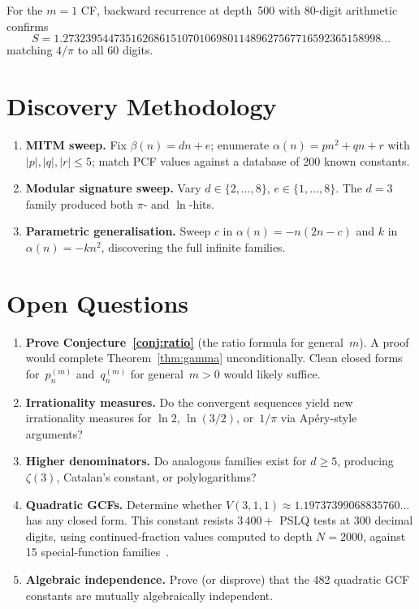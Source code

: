 \documentclass[11pt,a4paper]{article}
\theoremstyle{plain}
\theoremstyle{definition}
\theoremstyle{remark}
\begin{document}
For the $m = 1$ CF, backward recurrence at depth~500 with
80-digit arithmetic confirms
\[
  S = 1.27323954473516268615107010698011489627567716592365158998\ldots
\]
matching $4/\pi$ to all 60 digits.

\section{Discovery Methodology}\label{sec:method}

\begin{enumerate}
\item \textbf{MITM sweep.}
  Fix $\beta(n) = dn{+}e$; enumerate
  $\alpha(n) = pn^2{+}qn{+}r$ with $|p|,|q|,|r| \le 5$;
  match PCF values against a database of 200 known constants.
\item \textbf{Modular signature sweep.}
  Vary $d \in \{2,\ldots,8\}$, $e \in \{1,\ldots,8\}$.
  The $d{=}3$ family produced both $\pi$- and $\ln$-hits.
\item \textbf{Parametric generalisation.}
  Sweep $c$ in $\alpha(n) = -n(2n{-}c)$ and $k$ in
  $\alpha(n) = -kn^2$, discovering the full infinite families.
\end{enumerate}

\section{Open Questions}\label{sec:open}

\begin{enumerate}
\item \textbf{Prove Conjecture~\ref{conj:ratio}}
  (the ratio formula for general~$m$).
  A proof would complete Theorem~\ref{thm:gamma} unconditionally.
  Clean closed forms for~$p_n^{(m)}$ and~$q_n^{(m)}$ for
  general~$m > 0$ would likely suffice.
\item \textbf{Irrationality measures.}
  Do the convergent sequences yield new irrationality measures
  for $\ln 2$, $\ln(3/2)$, or~$1/\pi$ via Ap\'ery-style arguments?
\item \textbf{Higher denominators.}
  Do analogous families exist for $d \ge 5$, producing $\zeta(3)$,
  Catalan's constant, or polylogarithms?
\item \textbf{Quadratic GCFs.}
  Determine whether
  $V(3,1,1) \approx 1.19737399068835760\ldots$
  has any closed form.
  This constant resists $3\,400{+}$ PSLQ tests at $300$ decimal digits,
  using continued-fraction values computed to depth $N=2000$, against
  15 special-function families~\cite{raayoni2021}.
\item \textbf{Algebraic independence.}
  Prove (or disprove) that the 482 quadratic GCF constants are
  mutually algebraically independent.
\end{enumerate}
\end{document}
